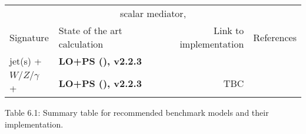 \begin{footnotesize}
\begin{table}
\begin{tabular}{llrr}
	\cmidrule(r){2-4} 
	\multicolumn{4}{c}{scalar mediator, \tchannel}\\
	\cmidrule(r){2-4} 
	Signature & State of the art calculation & Link to implementation & References \\ 
		\cmidrule(r){1-4} 
		
	jet(s) + \MET{} & \textbf{LO+PS (\madgraph), v2.2.3} & \cite{ForumSVN_TChannel}& \cite{Papucci:2014iwa} \\ 
	$W/Z/\gamma$ + \MET{} & \textbf{LO+PS (\madgraph), v2.2.3} & TBC  & \cite{Alwall:2014hca,Alloul:2013bka,Degrande:2011ua}\\ 
		
%	
	
	\bottomrule 
	\end{tabular}
\end{table}

\end{footnotesize}

\begin{center}
	Table 6.1: Summary table for recommended benchmark models and their implementation.
\end{center}
